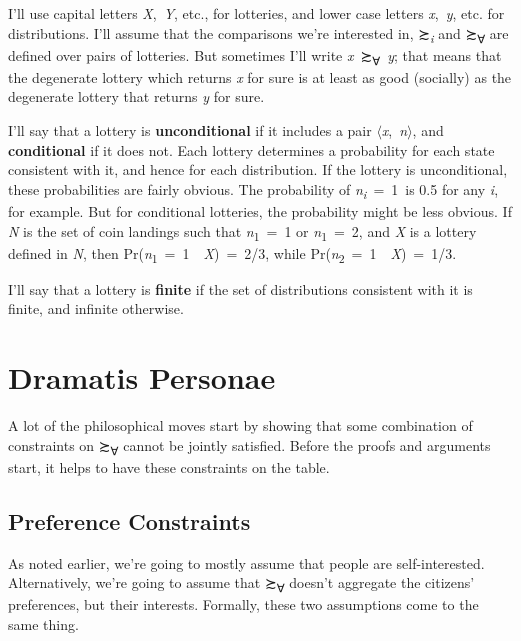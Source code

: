 \documentclass[
  11pt,
  letterpaper,
  DIV=11,
  numbers=noendperiod,
  twoside]{scrartcl}
\begin{document}
I'll use capital letters \emph{X},~\emph{Y}, etc., for lotteries, and
lower case letters \emph{x},~\emph{y}, etc. for distributions. I'll
assume that the comparisons we're interested in,
≿\textsubscript{\emph{i}} and ≿\textsubscript{∀} are defined over pairs
of lotteries. But sometimes I'll write
\emph{x}~≿\textsubscript{∀}~\emph{y}; that means that the degenerate
lottery which returns \emph{x} for sure is at least as good (socially)
as the degenerate lottery that returns \emph{y} for sure.

I'll say that a lottery is \textbf{unconditional} if it includes a pair
\(\langle\)\emph{x},~\emph{n}\(\rangle\), and \textbf{conditional} if it
does not. Each lottery determines a probability for each state
consistent with it, and hence for each distribution. If the lottery is
unconditional, these probabilities are fairly obvious. The probability
of \emph{n\textsubscript{i}}~=~1~is 0.5 for any \emph{i}, for example.
But for conditional lotteries, the probability might be less obvious. If
\emph{N} is the set of coin landings such that
\emph{n}\textsubscript{1}~=~1 or \emph{n}\textsubscript{1}~=~2, and
\emph{X} is a lottery defined in \emph{N}, then
Pr(\emph{n}\textsubscript{1}~=~1~\textbar~\emph{X})~=~2/3, while
Pr(\emph{n}\textsubscript{2}~=~1~\textbar~\emph{X})~=~1/3.

I'll say that a lottery is \textbf{finite} if the set of distributions
consistent with it is finite, and infinite otherwise.

\section{Dramatis Personae}\label{sec-principles}

A lot of the philosophical moves start by showing that some combination
of constraints on ≿\textsubscript{∀} cannot be jointly satisfied. Before
the proofs and arguments start, it helps to have these constraints on
the table.

\subsection{Preference Constraints}\label{preference-constraints}

As noted earlier, we're going to mostly assume that people are
self-interested. Alternatively, we're going to assume that
≿\textsubscript{∀} doesn't aggregate the citizens' preferences, but
their interests. Formally, these two assumptions come to the same thing.
\end{document}

